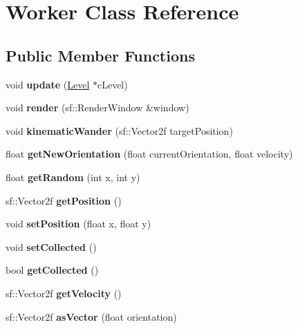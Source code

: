 \hypertarget{class_worker}{}\section{Worker Class Reference}
\label{class_worker}
\subsection*{Public Member Functions}
\begin{DoxyCompactItemize}
\item 
\mbox{\label{class_worker_a49e7401ac47258027acc58bec1cea653}} 
void {\bfseries update} (\mbox{\hyperlink{class_level}{Level}} $\ast$c\+Level)
\item 
\mbox{\label{class_worker_a18940af5e921feefc2373e120d66ff24}} 
void {\bfseries render} (sf\+::\+Render\+Window \&window)
\item 
\mbox{\label{class_worker_a2a4d4dae45d5a44fdb6dbae89fdf734e}} 
void {\bfseries kinematic\+Wander} (sf\+::\+Vector2f target\+Position)
\item 
\mbox{\label{class_worker_ab9bf14bfc025aede1ef9aed4c4cafd5f}} 
float {\bfseries get\+New\+Orientation} (float current\+Orientation, float velocity)
\item 
\mbox{\label{class_worker_adc26f6c33bf87fe8464924b688b35924}} 
float {\bfseries get\+Random} (int x, int y)
\item 
\mbox{\label{class_worker_a47aa8d5eb21900530255e6a66b7801d9}} 
sf\+::\+Vector2f {\bfseries get\+Position} ()
\item 
\mbox{\label{class_worker_a1abc543386dd19c59dd6ba7cde956a6d}} 
void {\bfseries set\+Position} (float x, float y)
\item 
\mbox{\label{class_worker_ab9a4b4b8fea6bd8abefd465bfbbf37fe}} 
void {\bfseries set\+Collected} ()
\item 
\mbox{\label{class_worker_aa6e42c6c398e3758ec7093db3cf4dc4d}} 
bool {\bfseries get\+Collected} ()
\item 
\mbox{\label{class_worker_a70dc1ab67651cc41baee826cbc4e12ac}} 
sf\+::\+Vector2f {\bfseries get\+Velocity} ()
\item 
\mbox{\label{class_worker_aa0e0a33dce4927628261dc8184b15d7a}} 
sf\+::\+Vector2f {\bfseries as\+Vector} (float orientation)
\end{DoxyCompactItemize}
